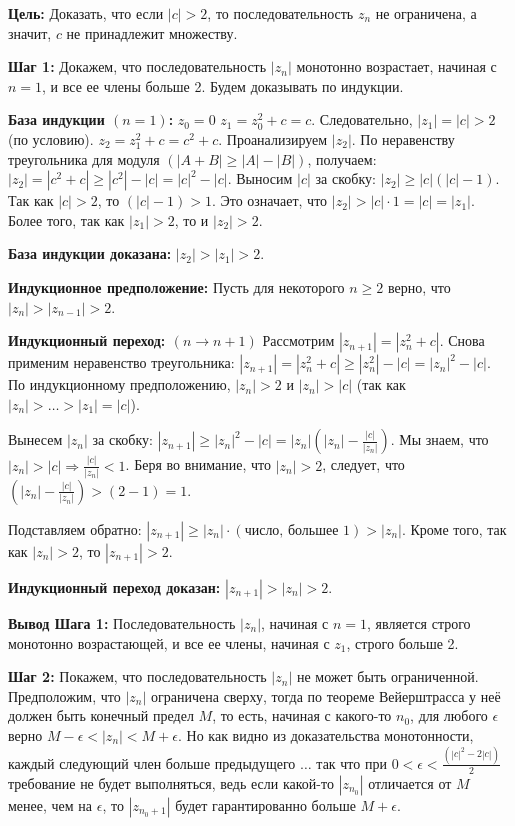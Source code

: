 \documentclass[a4paper,12pt]{article}
\begin{document}
\textbf{Цель:} Доказать, что если $|c|>2$, то последовательность $z_{n}$ не ограничена, а значит, $c$ не принадлежит множеству.

\textbf{Шаг 1:} Докажем, что последовательность $|z_{n}|$ монотонно возрастает, начиная с $n=1$, и все ее члены больше 2. Будем доказывать по индукции.

\textbf{База индукции $(n=1)$:}
$z_{0}=0$
$z_{1}=z_{0}^{2}+c=c$. Следовательно, $|z_{1}|=|c|>2$ (по условию).
$z_{2}=z_{1}^{2}+c=c^{2}+c.$
Проанализируем $|z_{2}|$. По неравенству треугольника для модуля $(|A+B|\ge|A|-|B|)$, получаем: $|z_{2}|=|c^{2}+c| \ge |c^{2}|-|c|=|c|^{2}-|c|$.
Выносим $|c|$ за скобку: $|z_{2}|\ge|c|(|c|-1)$.
Так как $|c|>2$, то $(|c|-1)>1$. Это означает, что $|z_{2}|>|c|\cdot 1=|c|=|z_{1}|$. Более того, так как $|z_{1}|>2$, то и $|z_{2}|>2$.

\textbf{База индукции доказана:} $|z_{2}|>|z_{1}|>2$.

\textbf{Индукционное предположение:} Пусть для некоторого $n\ge 2$ верно, что $|z_{n}| > |z_{n-1}|>2$.

\textbf{Индукционный переход: $(n \to n+1)$} Рассмотрим $|z_{n+1}|=|z_{n}^{2}+c|.$
Снова применим неравенство треугольника: $|z_{n+1}|=|z_{n}^{2}+c| \ge |z_{n}^{2}|-|c|=|z_{n}|^{2}-|c|.$
По индукционному предположению, $|z_{n}|>2$ и $|z_{n}|>|c|$ (так как $|z_{n}|>\dots>|z_{1}|=|c|$).

Вынесем $|z_{n}|$ за скобку: $|z_{n+1}| \ge |z_{n}|^{2}-|c|=|z_{n}|(|z_{n}|-\frac{|c|}{|z_{n}|})$.
Мы знаем, что $|z_{n}|>|c| \Rightarrow \frac{|c|}{|z_{n}|}<1$. Беря во внимание, что $|z_{n}|>2$, следует, что $(|z_{n}|-\frac{|c|}{|z_{n}|})>(2-1)=1$.

Подставляем обратно: $|z_{n+1}| \ge |z_{n}|\cdot (\text{число, большее } 1)>|z_{n}|$.
Кроме того, так как $|z_{n}|>2$, то $|z_{n+1}|>2$.

\textbf{Индукционный переход доказан:} $|z_{n+1}|>|z_{n}|>2$.

\textbf{Вывод Шага 1:} Последовательность $|z_{n}|$, начиная с $n=1$, является строго монотонно возрастающей, и все ее члены, начиная с $z_{1}$, строго больше 2.

\textbf{Шаг 2:} Покажем, что последовательность $|z_{n}|$ не может быть ограниченной.
Предположим, что $|z_{n}|$ ограничена сверху, тогда по теореме Вейерштрасса у неё должен быть конечный предел $M$, то есть, начиная с какого-то $n_{0}$, для любого $\epsilon$ верно $M-\epsilon<|z_{n}|<M+\epsilon.$ Но как видно из доказательства монотонности, каждый следующий член больше предыдущего $\dots$ так что при $0<\epsilon<\frac{(|c|^{2}-2|c|)}{2}$ требование не будет выполняться, ведь если какой-то $|z_{n_{0}}|$ отличается от $M$ менее, чем на $\epsilon$, то $|z_{n_{0}+1}|$ будет гарантированно больше $M+\epsilon$.
\end{document}
